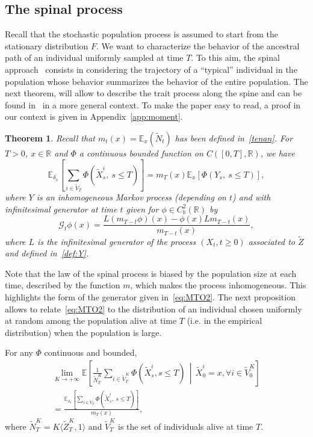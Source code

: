 \documentclass[10pt]{amsart}
\newtheorem{theo}{Theorem}[section]
\theoremstyle{definition}\newtheorem{defi}[theo]{Definition}\newtheorem{rema}[theo]{Remark}\newtheorem{exam}[theo]{Example}\newtheorem{exem}[theo]{Example}\newtheorem{nota}[theo]{Notation}
\newcommand{\Go}{\mathcal{G}}
\newcommand*\R{\mathbb{R}}
\newcommand*\E{\mathbb{E}}
\let\oldforall\forall
\renewcommand*{\forall}{\mathrel{\oldforall}}
\begin{document}
\subsection{The spinal process} 
Recall that the stochastic population process is assumed to start from the stationary distribution $F$. We want to characterize the behavior of the ancestral path of an individual uniformly sampled at time $T$. To this aim, the spinal app\-roach~\cite{bansaye_limit_2011,hardyharris2,hardyharris3} consists in considering the trajectory of a ``typical'' individual in the population whose behavior summarizes the behavior of the entire population. The next theorem, will allow to describe the trait process along the spine and can be found in~\cite{Marguet2} in a more general context. To make the paper easy to read, a proof in our context is given in Appendix~\ref{app:moment}.
\begin{theo}\label{spine}
Recall that $m_t(x)=\E_x(\widetilde{N}_t)$ has been defined in~\eqref{tenan}. For $T>0$, $x\in \R$ and $\Phi$ a continuous bounded function on $C([0,T],\R)$, we have
\begin{equation}\label{eq:MTO2}
\E_{\delta_{x}}\left[\sum_{i \in \widetilde{V}_{T}}\Phi\left(\widetilde{X}^i_{s},\ s\leq T\right) \right]={m_{T}(x)}\E_{x}\left[\Phi\left(Y_{s},\ s\leq T\right) \right],
\end{equation}
where $Y$ is an inhomogeneous Markov process (depending on $t$) and with infinitesimal generator at time $t$ given for $\phi\in C_{b}^2(\R)$ by
\begin{equation}\label{eq:generatorG}
\Go_t \phi(x)=\frac{L\left(m_{T-t}\phi\right)(x)-\phi(x)Lm_{T-t}(x)}{m_{T-t}(x)},
\end{equation}
where $L$ is the infinitesimal generator of the process $(X_{t}, t\ge 0)$ associated to $\widetilde{Z}$ and defined in~\eqref{def:Y}.
\end{theo}


Note that the law of the spinal process is biased by the population size at each time, described by the function $m$, which makes the process inhomogeneous. This highlights the form of the generator given in~\eqref{eq:MTO2}. 
The next proposition allows to relate~\eqref{eq:MTO2} to the distribution of an individual chosen uniformly at random among the population alive at time $T$ (i.e. in the empirical distribution) when the population is large.


\begin{prop}\label{prop:LGN}
For any $\Phi$ continuous and bounded,
\begin{multline*}
\lim_{K \to +\infty}\E\left[\frac{1}{\widetilde N^K_{T}}\sum_{i \in \widetilde V^K_{T}}\Phi\left(\widetilde{X}^i_{s},  s\leq T\right) \, \middle|\, \widetilde{X}^i_{0} = x, \forall i\in \widetilde V^K_{0}\right]\\
 = \frac{\E_{\delta_{x}}\left[\sum\limits_{i \in \widetilde V_{T}}\Phi\left(\widetilde{X}^i_{s},\ s\leq T\right) \right]}{m_{T}(x)},
\end{multline*}
where $\widetilde N^K_{T} = K \langle \widetilde Z^K_{T},1\rangle$ and $\widetilde V^K_{T}$ is the set of individuals alive at time $T$.
\end{prop}
\end{document}
